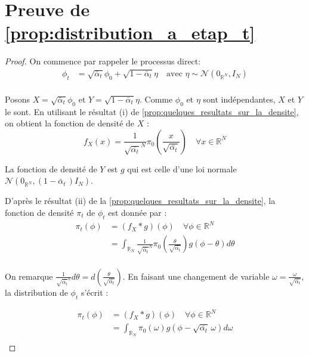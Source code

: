 \documentclass[a4paper,10pt]{article}
\theoremstyle{definition} %
\theoremstyle{definition} %
\theoremstyle{definition} %
\theoremstyle{definition} %
\newcommand{\R}{\mathbb{R}}
\begin{document}
\section{Preuve de \cref{prop:distribution_a_etap_t}} \label{sec:proof_distribution_a_etap_t}
\begin{proof}
    On commence par rappeler le processus direct:
    \begin{align*}
    \phi_t &= \sqrt{\bar \alpha_t}\phi_0 + \sqrt{1-\bar \alpha_t} \eta \quad \text{avec } \eta \sim \mathcal{N}(0_{\R^N},I_N)\\
    \end{align*}

    Posons $X = \sqrt{\bar \alpha_t}\phi_0$ et $Y = \sqrt{1-\bar \alpha_t} \eta$. Comme $\phi_0$ et $\eta$ sont indépendantes, $X$ et $Y$ le sont. En utilisant le résultat (i) de \cref{prop:quelques_resultats_sur_la_densite}, on obtient la fonction de densité de $X$ :
    \[f_X(x) = \frac{1}{\sqrt{\bar{\alpha_t}}^N} \pi_0\left(\frac{x}{\sqrt{\bar{\alpha_t}}}\right) \quad\forall x \in \R^N\]

    La fonction de densité de $Y$ est $g$ qui est celle d'une loi normale $\mathcal{N}\left(0_{\R^N}, (1-\bar \alpha _t\,)I_N\right)$.

    D'après le résultat (ii) de la  \cref{prop:quelques_resultats_sur_la_densite}, la fonction de densité $\pi_t$ de $\phi_t$ est donnée par :
    \begin{align*}
        \pi_t(\phi) &= (f_X*g)(\phi) \quad \forall\phi\in \R^N \\
        &= \int_{\R_N} \frac{1}{\sqrt{\bar{\alpha_t}}^N} \pi_0\left(\frac{\theta}{\sqrt{\bar{\alpha_t}}}\right) g(\phi -\theta) d\theta\\
    \end{align*}

    On remarque $\frac{1}{\sqrt{\bar{\alpha_t}}^n} d\theta = d\left(\frac{\theta}{\sqrt{\bar{\alpha_t}}}\right)$. En faisant une changement de variable $\omega = \frac{\omega}{\sqrt{\bar{\alpha_t}}}$, la distribution de $\phi_t$ s'écrit :
    
    \begin{align*}
        \pi_t(\phi) &= (f_X*g)(\phi) \quad \forall\phi\in \R^N \\
        &= \int_{\R_N}  \pi_0(\omega) g(\phi -\sqrt{\bar{\alpha_t}}\,\omega) d\omega\\
    \end{align*}
\end{proof}
\end{document}
